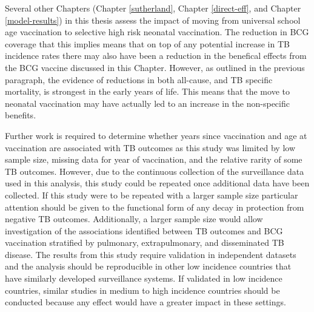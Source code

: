 \documentclass[11pt,twoside]{bristolthesis}
\begin{document}
  Several other Chapters (Chapter \ref{sutherland}, Chapter \ref{direct-eff}, and Chapter \ref{model-results}) in this thesis assess the impact of moving from universal school age vaccination to selective high risk neonatal vaccination. The reduction in BCG coverage that this implies means that on top of any potential increase in TB incidence rates there may also have been a reduction in the benefical effects from the BCG vaccine discussed in this Chapter. However, as outlined in the previous paragraph, the evidence of reductions in both all-cause, and TB specific mortality, is strongest in the early years of life. This means that the move to neonatal vaccination may have actually led to an increase in the non-specific benefits.
  
  Further work is required to determine whether years since vaccination and age at vaccination are associated with TB outcomes as this study was limited by low sample size, missing data for year of vaccination, and the relative rarity of some TB outcomes. However, due to the continuous collection of the surveillance data used in this analysis, this study could be repeated once additional data have been collected. If this study were to be repeated with a larger sample size particular attention should be given to the functional form of any decay in protection from negative TB outcomes. Additionally, a larger sample size would allow investigation of the associations identified between TB outcomes and BCG vaccination stratified by pulmonary, extrapulmonary, and disseminated TB disease. The results from this study require validation in independent datasets and the analysis should be reproducible in other low incidence countries that have similarly developed surveillance systems. If validated in low incidence countries, similar studies in medium to high incidence countries should be conducted because any effect would have a greater impact in these settings.
  
\end{document}
